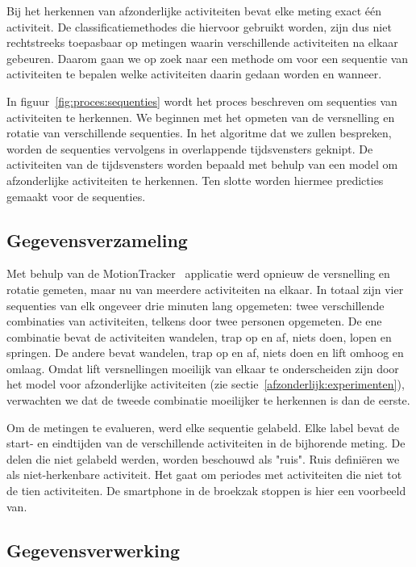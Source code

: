\documentclass{article}
\begin{document}
Bij het herkennen van afzonderlijke activiteiten bevat elke meting exact \'e\'en activiteit. De classificatiemethodes die hiervoor gebruikt worden, zijn dus niet rechtstreeks toepasbaar op metingen waarin verschillende activiteiten na elkaar gebeuren. Daarom gaan we op zoek naar een methode om voor een sequentie van activiteiten te bepalen welke activiteiten daarin gedaan worden en wanneer.

In figuur~\ref{fig:proces:sequenties} wordt het proces beschreven om sequenties van activiteiten te herkennen. We beginnen met het opmeten van de versnelling en rotatie van verschillende sequenties. In het algoritme dat we zullen bespreken, worden de sequenties vervolgens in overlappende tijdsvensters geknipt. De activiteiten van de tijdsvensters worden bepaald met behulp van een model om afzonderlijke activiteiten te herkennen. Ten slotte worden hiermee predicties gemaakt voor de sequenties.

\subsection{Gegevensverzameling}
\label{seq:gegevens}

Met behulp van de MotionTracker~\cite{meert and schietgat:motiontracker} applicatie werd opnieuw de versnelling en rotatie gemeten, maar nu van meerdere activiteiten na elkaar. In totaal zijn vier sequenties van elk ongeveer drie minuten lang opgemeten: twee verschillende combinaties van activiteiten, telkens door twee personen opgemeten. De ene combinatie bevat de activiteiten wandelen, trap op en af, niets doen, lopen en springen. De andere bevat wandelen, trap op en af, niets doen en lift omhoog en omlaag. Omdat lift versnellingen moeilijk van elkaar te onderscheiden zijn door het model voor afzonderlijke activiteiten (zie sectie~\ref{afzonderlijk:experimenten}), verwachten we dat de tweede combinatie moeilijker te herkennen is dan de eerste.

Om de metingen te evalueren, werd elke sequentie gelabeld. Elke label bevat de start- en eindtijden van de verschillende activiteiten in de bijhorende meting. De delen die niet gelabeld werden, worden beschouwd als "ruis". Ruis defini\"eren we als niet-herkenbare activiteit. Het gaat om periodes met activiteiten die niet tot de tien activiteiten. De smartphone in de broekzak stoppen is hier een voorbeeld van.

\subsection{Gegevensverwerking}
\end{document}
